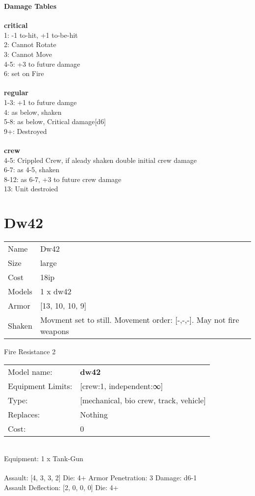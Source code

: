 {\bf Damage Tables} \\
\ \\ {\bf critical } \\
1: -1 to-hit, +1 to-be-hit \\
2: Cannot Rotate \\
3: Cannot Move \\
4-5: +3 to future damage \\
6: set on Fire \\
\ \\ {\bf regular } \\
1-3: +1 to future damge \\
4: as below, shaken \\
5-8: as below, Critical damage[d6] \\
9+: Destroyed \\
\ \\ {\bf crew } \\
4-5: Crippled Crew, if aleady shaken double initial crew damage \\
6-7: as 4-5, shaken \\
8-12: as 6-7, +3 to future crew damage \\
13: Unit destroied \\










\pagebreak\pagebreak

\section{ Dw42 }

\begin{tabular}{ll}
  Name & Dw42 \\
  Size & large\\
  Cost & 18ip\\
  Models & 1 x dw42\\
  Armor & [13, 10, 10, 9]\\
  Shaken & Movment set to still. Movement order: [-,-,-]. May not fire weapons\\
\end{tabular}

\noindent Fire Resistance 2\\ 


\noindent
\begin{tabular}{ll}
Model name: &{\bf dw42 } \\
Equipment Limits: &[crew:1, independent:∞] \\
Type: &[mechanical, bio crew, track, vehicle] \\
Replaces: &Nothing \\
Cost: & 0\\
\end{tabular}
\ \\
Equipment: 1 x Tank-Gun \\
\ \\
Assault: [4, 3, 3, 2] Die: 4+ Armor Penetration: 3 Damage: d6-1 \\
Assault Deflection: [2, 0, 0, 0] Die: 4+\\
\indent  
\ \\

